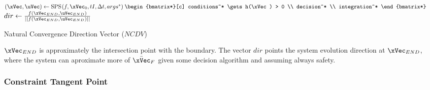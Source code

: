 

  \begin{algorithm}
    $(\xVec, \uVec) \gets \text{SPS}\hspace{0.1em}(f, \xVec_0, tI, \Delta t, args^*) \hspace{0.25em} \begin{bmatrix*}[c]  conditions^* \gets h(\xVec) > 0 \\ decision^* \\ integration^* \end{bmatrix*}$  
    $dir \gets \frac{f(\xVec_{END}, \uVec_{END})}{||f(\xVec_{END}, \uVec_{END})||}$ 
    \caption{Natural Convergence Direction Vector (\(NCDV\))} \label{alg:Natural_Convergence_Direction_Vector}
  \end{algorithm}

\(\xVec_{END}\) is approximately the intersection point with the boundary. The vector \(dir\) points the system evolution direction at \(\xVec_{END}\), where the system can aproximate more of \(\bar{\xVec}_F\) given some decision algorithm and assuming always safety. 

\subsubsection{Constraint Tangent Point}
\label{subsubsec:Constraint_Tangent_Point}

